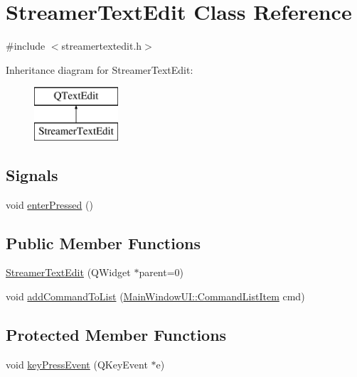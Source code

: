 \hypertarget{classStreamerTextEdit}{\section{Streamer\-Text\-Edit Class Reference}
\label{classStreamerTextEdit}
}


{\ttfamily \#include $<$streamertextedit.\-h$>$}

Inheritance diagram for Streamer\-Text\-Edit\-:\begin{figure}[H]
\begin{center}
\leavevmode
\includegraphics[height=2.000000cm]{classStreamerTextEdit}
\end{center}
\end{figure}
\subsection*{Signals}
\begin{DoxyCompactItemize}
\item 
void \hyperlink{classStreamerTextEdit_aef9c5b51fb00edb2f984128e612629be}{enter\-Pressed} ()
\end{DoxyCompactItemize}
\subsection*{Public Member Functions}
\begin{DoxyCompactItemize}
\item 
\hyperlink{classStreamerTextEdit_a92180ec1922ebb95e6eee9f6463a4190}{Streamer\-Text\-Edit} (Q\-Widget $\ast$parent=0)
\item 
void \hyperlink{classStreamerTextEdit_ac89b399e38a953a0a1835259e91881df}{add\-Command\-To\-List} (\hyperlink{namespaceMainWindowUI_ab4a56a6d14c3fc1c53d1f1373a9033d3}{Main\-Window\-U\-I\-::\-Command\-List\-Item} cmd)
\end{DoxyCompactItemize}
\subsection*{Protected Member Functions}
\begin{DoxyCompactItemize}
\item 
void \hyperlink{classStreamerTextEdit_ad30da0518b808ace5b97f0a160a2f89c}{key\-Press\-Event} (Q\-Key\-Event $\ast$e)
\end{DoxyCompactItemize}


